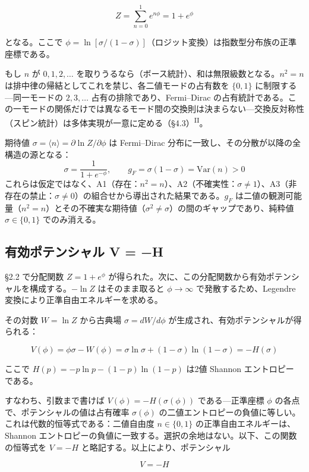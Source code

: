 \documentclass[fontsize=11pt,paper=a4,lualatex]{jlreq}
\newcommand{\PII}{\textsuperscript{\textup{II}}}
\begin{document}
\[Z = \sum_{n=0}^{1} e^{n\phi} = 1 + e^{\phi}\]

となる。ここで $\phi = \ln[\sigma/(1{-}\sigma)]$（ロジット変換）は指数型分布族の正準座標である。

もし $n$ が $0, 1, 2, \dots$ を取りうるなら（ボース統計）、和は無限級数となる。$n^2 = n$ は排中律の帰結としてこれを禁じ、各二値モードの占有数を $\{0,1\}$ に制限する---同一モードの $2, 3, \dots$ 占有の排除であり、Fermi--Dirac の占有統計である。この一モードの関係だけでは異なるモード間の交換則は決まらない---交換反対称性（スピン統計）は多体実現が一意に定める（\S4.3）\PII{}。

期待値 $\sigma = \langle n \rangle = \partial\ln Z/\partial\phi$ は Fermi--Dirac 分布に一致し、その分散が以降の全構造の源となる：
\[
  \sigma = \frac{1}{1+e^{-\phi}}, \qquad
  g_F = \sigma(1{-}\sigma) = \mathrm{Var}(n) > 0
\]
これらは仮定ではなく、A1（存在：$n^2 = n$）、A2（不確実性：$\sigma \neq 1$）、A3（非存在の禁止：$\sigma \neq 0$）の組合せから導出された結果である。$g_F$ は二値の観測可能量（$n^2 = n$）とその不確実な期待値（$\sigma^2 \neq \sigma$）の間のギャップであり、純粋値 $\sigma \in \{0,1\}$ でのみ消える。

\subsection{有効ポテンシャル V =
−H}\label{ux6709ux52b9ux30ddux30c6ux30f3ux30b7ux30e3ux30eb-v-h}

§2.2 で分配関数 $Z = 1+e^{\phi}$ が得られた。次に、この分配関数から有効ポテンシャルを構成する。$-\ln Z$ はそのまま取ると $\phi \to \infty$ で発散するため、Legendre 変換により正準自由エネルギーを求める。

その対数 $W = \ln Z$ から古典場 $\sigma = dW/d\phi$ が生成され、有効ポテンシャルが得られる：

\[V(\phi) = \phi\sigma − W(\phi) = \sigma\ln\sigma + (1−\sigma)\ln(1−\sigma) = −H(\sigma)\]

ここで $H(p) = −p\ln p − (1−p)\ln(1−p)$ は2値 Shannon エントロピー \cite{shannon} である。

すなわち、引数まで書けば $V(\phi) = -H(\sigma(\phi))$ である---正準座標 $\phi$ の各点で、ポテンシャルの値は占有確率 $\sigma(\phi)$ の二値エントロピーの負値に等しい。これは代数的恒等式である：二値自由度 $n \in \{0,1\}$ の正準自由エネルギーは、Shannon エントロピーの負値に一致する。選択の余地はない。以下、この関数の恒等式を $V = -H$ と略記する。以上により、ポテンシャル

\[V = -H\]
\end{document}
